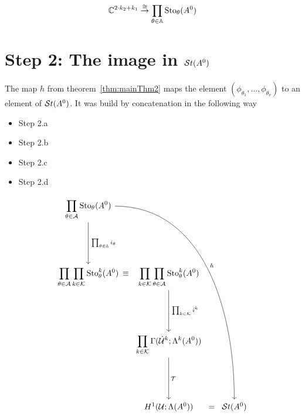 \begin{prop}
  \TODO{}
  \[
    \mathbb{C}^{2\cdot k_2 + k_1}
    \overset\cong\to
    \prod_{\theta\in\mathbb{A}}\operatorname{Sto}_\theta(A^0)
  \]
\end{prop}


\section{Step 2: The image in $\mathcal{S}{}t(A^0)$}
The map $h$ from theorem~\ref{thm:mainThm2} maps the element
$(\phi_{\theta_1},\dots,\phi_{\theta_\nu})$ to an element of $\mathcal{S}{}t(A^0)$.
It was build by concatenation in the following way
\bgroup
{}
\begin{paracol}{2}\sloppy
\switchcolumn[0]\noindent
  \vspace*{40mm}
  \begin{itemize}
    \item[] Step 2.a 
    \item[] Step 2.b 
    \item[] Step 2.c 
    \item[] Step 2.d 
  \end{itemize}
\switchcolumn[1]\noindent
  \[ \begin{tikzcd}[column sep=0,row sep=1.8cm]
      \displaystyle \prod_{\theta\in\cA}\Sto_\theta(A^0)
      \dar{\tikzmark{e1}\prod_{\theta\in\A}i_\theta}
      \arrow[dddrrrr, out=0,in=90,"h"]
    \\\displaystyle \prod_{\theta\in\cA}\prod_{k\in\cK}\Sto_\theta^k(A^0)
    &\tikzmark{e2}\!\!\!\!\equiv
    &\displaystyle \prod_{k\in\cK}\prod_{\theta\in\cA}\Sto_\theta^k(A^0)
      \dar{\tikzmark{e3}\prod_{k\in\cK}i^k}
    \\&&\displaystyle \prod_{k\in\cK}\Gamma(\dot\cU^k;\Lambda^k(A^0))
      \dar{\tikzmark{e4}\cT}
    \\&&H^1(\cU;\Lambda(A^0))&=&\St(A^0)
  \end{tikzcd} \]
\end{paracol}
\egroup

